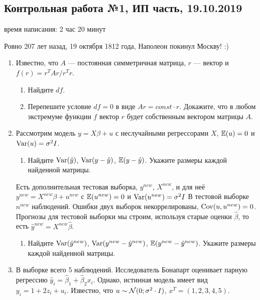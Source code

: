 \subsection{Контрольная работа №1, ИП часть, 19.10.2019}

время написания: 2 час 20 минут


Ровно 207 лет назад, 19 октября 1812 года, Наполеон покинул Москву! :)

\begin{enumerate}

\item Известно, что $A$ — постоянная симметричная матрица, $r$ — вектор и $f(r) = r^T Ar / r^Tr$.

\begin{enumerate}
\item Найдите $df$. 
\item Перепешите условие $df=0$ в виде $Ar = const \cdot r$. Докажите, что в любом экстремуме функции $f$ вектор $r$ будет собственным вектором матрицы $A$. 
\end{enumerate}


\item Рассмотрим модель $y = X\beta + u$ с неслучайными регрессорами $X$, $\operatorname{\mathbb{E}}(u)=0$ и $\operatorname{Var}(u) = \sigma^2 I$.

\begin{enumerate}
\item Найдите $\operatorname{Var}(\hat y)$, $\operatorname{Var}(y - \hat y)$, $\operatorname{\mathbb{E}}(y - \hat y)$. Укажите размеры каждой найденной матрицы. 
\end{enumerate}

Есть дополнительная тестовая выборка, $y^{new}$, $X^{new}$, и для неё $y^{new} = X^{new}\beta + u^{new}$ с $\operatorname{\mathbb{E}}(u^{new})=0$ и $\operatorname{Var}(u^{new}) = \sigma^2 I$
В тестовой выборке $n^{new}$ наблюдений. Ошибки двух выборок некоррелированы, $\operatorname{Cov}(u, u^{new}) = 0$.
Прогнозы для тестовой выборки мы строим, используя старые оценки $\hat\beta$, то есть $\hat y^{new} = X^{new}\hat\beta$.

\begin{enumerate}[resume]
\item Найдите $\operatorname{Var}(\hat y^{new})$, $\operatorname{Var}(y^{new} - \hat y^{new})$, $\operatorname{\mathbb{E}}(y^{new} - \hat y^{new})$. Укажите размеры каждой найденной матрицы. 
\end{enumerate}
    

\item В выборке всего 5 наблюдений. Исследователь Бонапарт оценивает парную регрессию $\hat y_i = \hat \beta_1 + \hat \beta_2 x_i$.
Однако, истинная модель имеет вид $y_i = 1 + 2 z_i + u_i$. 
Известно, что $u \sim \mathcal{N}(0;\sigma^2 \cdot I)$, $x^T = (1, 2, 3, 4, 5)$.


\end{enumerate}
